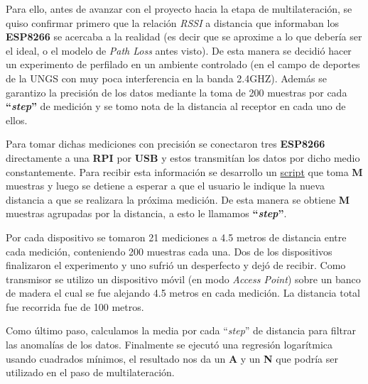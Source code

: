 Para ello, antes de avanzar con el proyecto hacia la etapa de multilateración, se quiso confirmar primero que la relación \textit{RSSI} a distancia que informaban los \textbf{ESP8266} se acercaba a la realidad (es decir que se aproxime a lo que debería ser el ideal, o el modelo de \textit{Path Loss} antes visto). De esta manera se decidió hacer un experimento de perfilado en un ambiente controlado (en el campo de deportes de la UNGS con muy poca interferencia en la banda 2.4GHZ). Además se garantizo la precisión de los datos mediante la toma de 200 muestras por cada\textbf{ “\textit{step}”} de medición y se tomo nota de la distancia al receptor en cada uno de ellos.

Para tomar dichas mediciones con precisión se conectaron tres \textbf{ESP8266} directamente a una \textbf{RPI} por \textbf{USB} y estos transmitían los datos por dicho medio constantemente. Para recibir esta información se desarrollo un \href{https://github.com/agusalex/PacketSnifferServer}{script} que toma \textbf{M} muestras y luego se detiene a esperar a que el usuario le indique la nueva distancia a que se realizara la próxima medición. De esta manera se obtiene \textbf{M} muestras agrupadas por la distancia, a esto le llamamos\textbf{ “\textit{step}”}.

Por cada dispositivo se tomaron 21 mediciones a 4.5 metros de distancia entre cada medición, conteniendo 200 muestras cada una. Dos de los dispositivos finalizaron el experimento y uno sufrió un desperfecto y dejó de recibir. Como transmisor se utilizo un dispositivo móvil (en modo \textit{Access Point}) sobre un banco de madera el cual se fue alejando 4.5 metros en cada medición. La distancia total fue recorrida fue de 100 metros.

Como último paso, calculamos la media por cada “\textit{step}” de distancia para filtrar las anomalías de los datos. Finalmente se ejecutó una regresión logarítmica usando cuadrados mínimos, el resultado nos da un \textbf{A} y un \textbf{N} que podría ser utilizado en el paso de multilateración.
